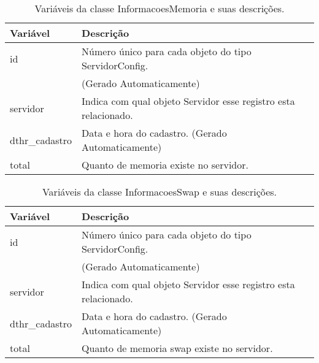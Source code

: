 \begin{table}[!ht]
\centering
\begin{tabular}{|l|l|}
\hline
{\color[HTML]{000000} \textbf{Variável}} & {\color[HTML]{000000} \textbf{Descrição}}                                      \\ \hline
id                                       & Número único para cada objeto do tipo ServidorConfig.\\ 
																				 &(Gerado Automaticamente) 																												\\ \hline
servidor                                 & Indica com qual objeto Servidor esse registro esta relacionado.                       \\ \hline
dthr\_cadastro                           & Data e hora do cadastro. (Gerado Automaticamente)                              \\ \hline
total                                    & Quanto de memoria existe no servidor.                                          \\ \hline
\end{tabular}
\caption[Variáveis da classe InformacoesMemoria e suas descrições.]{Variáveis da classe InformacoesMemoria e suas descrições.}
\label{Tab:VariaveisInformacoesMemoria}
\end{table}


\begin{table}[!ht]
\centering
\begin{tabular}{|l|l|}
\hline
{\color[HTML]{000000} \textbf{Variável}} & {\color[HTML]{000000} \textbf{Descrição}}                                      \\ \hline
id                                       & Número único para cada objeto do tipo ServidorConfig.\\ 
																				 &(Gerado Automaticamente) 																												\\ \hline
servidor                                 & Indica com qual objeto Servidor esse registro esta relacionado.                       \\ \hline
dthr\_cadastro                           & Data e hora do cadastro. (Gerado Automaticamente)                              \\ \hline
total                                    & Quanto de memoria swap existe no servidor.                                     \\ \hline
\end{tabular}
\caption[Variáveis da classe InformacoesSwap e suas descrições.]{Variáveis da classe InformacoesSwap e suas descrições.}
\label{Tab:VariaveisInformacoesSwap}
\end{table}


